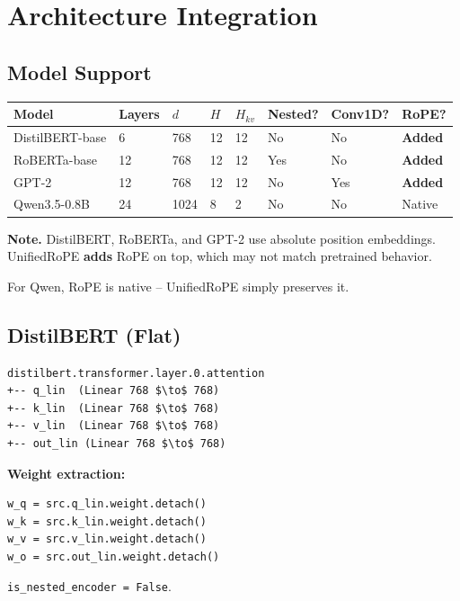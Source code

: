 
\section{Architecture Integration}

\subsection{Model Support}

\begin{table}[H]
\centering
\small
\begin{tabular}{llllllll}
\toprule
\textbf{Model} & \textbf{Layers} & \textbf{$d$} & \textbf{$H$} & \textbf{$H_{kv}$} & \textbf{Nested?} & \textbf{Conv1D?} & \textbf{RoPE?} \\
\midrule
DistilBERT-base & 6 & 768 & 12 & 12 & No & No & \textbf{Added} \\
RoBERTa-base & 12 & 768 & 12 & 12 & Yes & No & \textbf{Added} \\
GPT-2 & 12 & 768 & 12 & 12 & No & Yes & \textbf{Added} \\
Qwen3.5-0.8B & 24 & 1024 & 8 & 2 & No & No & Native \\
\bottomrule
\end{tabular}
\end{table}

\textbf{Note.} DistilBERT, RoBERTa, and GPT-2 use absolute position embeddings. 
UnifiedRoPE \textbf{adds} RoPE on top, which may not match pretrained behavior.

For Qwen, RoPE is native -- UnifiedRoPE simply preserves it.

\subsection{DistilBERT (Flat)}

\begin{lstlisting}
distilbert.transformer.layer.0.attention
+-- q_lin  (Linear 768 $\to$ 768)
+-- k_lin  (Linear 768 $\to$ 768)
+-- v_lin  (Linear 768 $\to$ 768)
+-- out_lin (Linear 768 $\to$ 768)
\end{lstlisting}

\textbf{Weight extraction:}
\begin{lstlisting}
w_q = src.q_lin.weight.detach()
w_k = src.k_lin.weight.detach()
w_v = src.v_lin.weight.detach()
w_o = src.out_lin.weight.detach()
\end{lstlisting}

\texttt{is\_nested\_encoder = False}.

